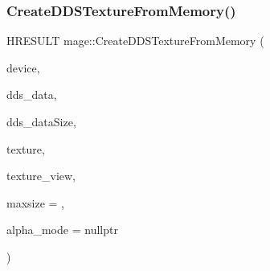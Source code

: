 \subsubsection{\texorpdfstring{Create\+D\+D\+S\+Texture\+From\+Memory()}{CreateDDSTextureFromMemory()}\hspace{0.1cm}{\footnotesize\ttfamily [1/4]}}
{\footnotesize\ttfamily H\+R\+E\+S\+U\+LT mage\+::\+Create\+D\+D\+S\+Texture\+From\+Memory (\begin{DoxyParamCaption}\item[{\+\_\+\+In\+\_\+ \hyperlink{namespacemage_ae74f374780900893caa5555d1031fd79}{Com\+Ptr}$<$ I\+D3\+D11\+Device2 $>$}]{device,  }\item[{\+\_\+\+In\+\_\+reads\+\_\+bytes\+\_\+(dds\+\_\+data\+Size) const uint8\+\_\+t $\ast$}]{dds\+\_\+data,  }\item[{\+\_\+\+In\+\_\+ size\+\_\+t}]{dds\+\_\+data\+Size,  }\item[{\+\_\+\+Outptr\+\_\+opt\+\_\+ I\+D3\+D11\+Resource $\ast$$\ast$}]{texture,  }\item[{\+\_\+\+Outptr\+\_\+opt\+\_\+ I\+D3\+D11\+Shader\+Resource\+View $\ast$$\ast$}]{texture\+\_\+view,  }\item[{\+\_\+\+In\+\_\+ size\+\_\+t}]{maxsize = {},  }\item[{\+\_\+\+Out\+\_\+opt\+\_\+ \hyperlink{namespacemage_a0c586a2bad862f4858900ca121ca80c2}{D\+D\+S\+\_\+\+A\+L\+P\+H\+A\+\_\+\+M\+O\+DE} $\ast$}]{alpha\+\_\+mode = {\ttfamily nullptr} }\end{DoxyParamCaption})}

\hypertarget{namespacemage_a6946968ad9beaed0ce448d1bfcdf3052}{}\label{namespacemage_a6946968ad9beaed0ce448d1bfcdf3052} 
